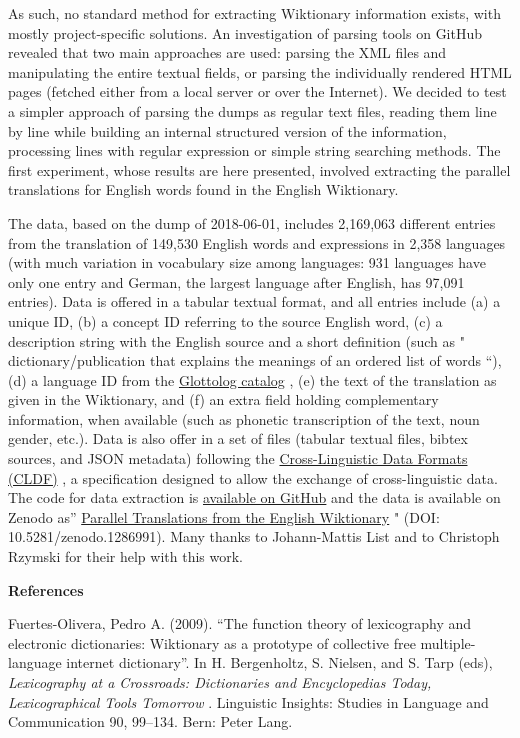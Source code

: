 \documentclass[
  english,
  a4paper,
  oneside,tablecaptionabove
]{scrbook}
\begin{document}
As such, no standard method for extracting Wiktionary information
exists, with mostly project-specific solutions. An investigation of
parsing tools on GitHub revealed that two main approaches are used:
parsing the XML files and manipulating the entire textual fields, or
parsing the individually rendered HTML pages (fetched either from a
local server or over the Internet). We decided to test a simpler
approach of parsing the dumps as regular text files, reading them line
by line while building an internal structured version of the
information, processing lines with regular expression or simple string
searching methods. The first experiment, whose results are here
presented, involved extracting the parallel translations for English
words found in the English Wiktionary.

The data, based on the dump of 2018-06-01, includes 2,169,063 different
entries from the translation of 149,530 English words and expressions in
2,358 languages (with much variation in vocabulary size among languages:
931 languages have only one entry and German, the largest language after
English, has 97,091 entries). Data is offered in a tabular textual
format, and all entries include (a) a unique ID, (b) a concept ID
referring to the source English word, (c) a description string with the
English source and a short definition (such as " {dictionary/publication
that explains the meanings of an ordered list of words} \enquote{), (d)
a language ID from the \href{http://glottolog.org}{Glottolog catalog} ,
(e) the text of the translation as given in the Wiktionary, and (f) an
extra field holding complementary information, when available (such as
phonetic transcription of the text, noun gender, etc.). Data is also
offer in a set of files (tabular textual files, bibtex sources, and JSON
metadata) following the \href{http://cldf.clld.org}{Cross-Linguistic
Data Formats (CLDF)} , a specification designed to allow the exchange of
cross-linguistic data. The code for data extraction is
\href{https://github.com/tresoldi/wiktionary_parser}{available on
GitHub} and the data is available on Zenodo as}
\href{https://zenodo.org/record/1286991}{Parallel Translations from the
English Wiktionary} " (DOI: 10.5281/zenodo.1286991). Many thanks to
Johann-Mattis List and to Christoph Rzymski for their help with this
work.

\textbf{References}

Fuertes-Olivera, Pedro A. (2009). \enquote{The function theory of
lexicography and electronic dictionaries: Wiktionary as a prototype of
collective free multiple-language internet dictionary}. In H.
Bergenholtz, S. Nielsen, and S. Tarp (eds), \emph{Lexicography at a
Crossroads: Dictionaries and Encyclopedias Today, Lexicographical Tools
Tomorrow} . Linguistic Insights: Studies in Language and Communication
90, 99--134. Bern: Peter Lang.
\end{document}
